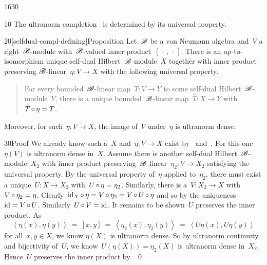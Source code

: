 \begin{parsec}{1630}%
\begin{point}{10}%
The ultranorm completion~
    is determined by its universal property.
\end{point}
\begin{point}{20}[selfdual-compl-defining]{Proposition}%
Let~$\mathscr{B}$ be a von Neumann algebra and~$V$ a right~$\mathscr{B}$-module
    with~$\mathscr{B}$-valued inner product~$[\,\cdot\,,\,\cdot\,]$.
There is an up-to-isomorphism unique
    self-dual Hilbert~$\mathscr{B}$-module~$X$
    together with inner product preserving $\mathscr{B}$-linear~$\eta \colon V \to X$
    with the following universal property.
    \begin{quote}
    For every bounded~$\mathscr{B}$-linear map~$T\colon V \to Y$
    to some self-dual Hilbert~$\mathscr{B}$-module~$Y$,
    there is a unique bounded~$\mathscr{B}$-linear map~$\hat{T}\colon X \to Y$
    with~$\hat{T} \mathop{\circ} \eta = T$.
    \end{quote}
Moreover, for such~$\eta\colon V \to X$,
    the image of~$V$ under~$\eta$ is ultranorm dense.
\begin{point}{30}{Proof}%
We already know such a~$X$ and~$\eta\colon V \to X$
    exist by~
    and~.
For this one~$\eta(V)$ is ultranorm dense in~$X$.
Assume there is another self-dual Hilbert~$\mathscr{B}$-module~$X_2$
    with inner product preserving~$\mathscr{B}$-linear~$\eta_2\colon V \to X_2$
    satisfying the universal property.
By the universal property of~$\eta$ applied to~$\eta_2$,
    there must exist a unique~$U \colon X  \to X_2$
    with~$U \mathop{\circ} \eta  = \eta_2$.
Similarly, there is a~$V \colon X_2 \to X$
    with~$V \mathop{\circ} \eta_2 = \eta$.
Clearly~$\mathrm{id}_{X} \mathop{\circ} \eta = V \mathop{\circ} \eta_2 = V \mathop{\circ} U \mathop{\circ} \eta$
    and so by the uniqueness~$\mathrm{id} = V\mathop{\circ} U$.
    Similarly~$U \mathop{\circ} V = \mathrm{id}$.
It remains to be shown~$U$ preserves the inner product.
As
\begin{equation*}
    \left<\eta(x),\eta(y)\right>
    \ =\  [x,y]
    \ =\  \left<\eta_2(x), \eta_2(y)\right>
    \ =\  \left<U \eta(x), U \eta(y)\right>
\end{equation*}
for all~$x,y \in X$, we know
$\eta(X)$ is ultranorm dense.
So by ultranorm continuity and bijectivity of~$U$,
    we know~$U(\eta(X)) = \eta_2(X)$ is ultranorm dense in~$X_2$.
Hence~$U$ preserves the inner product by~
\qed
\end{point}
\end{point}
\end{parsec}

